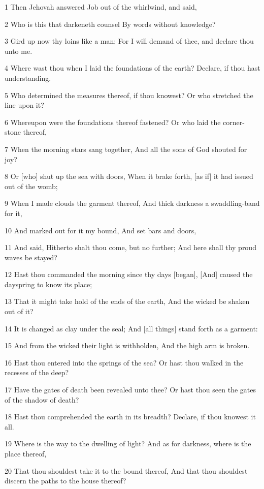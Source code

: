 \par 1 Then Jehovah answered Job out of the whirlwind, and said,
\par 2 Who is this that darkeneth counsel By words without knowledge?
\par 3 Gird up now thy loins like a man; For I will demand of thee, and declare thou unto me.
\par 4 Where wast thou when I laid the foundations of the earth? Declare, if thou hast understanding.
\par 5 Who determined the measures thereof, if thou knowest? Or who stretched the line upon it?
\par 6 Whereupon were the foundations thereof fastened? Or who laid the corner-stone thereof,
\par 7 When the morning stars sang together, And all the sons of God shouted for joy?
\par 8 Or [who] shut up the sea with doors, When it brake forth, [as if] it had issued out of the womb;
\par 9 When I made clouds the garment thereof, And thick darkness a swaddling-band for it,
\par 10 And marked out for it my bound, And set bars and doors,
\par 11 And said, Hitherto shalt thou come, but no further; And here shall thy proud waves be stayed?
\par 12 Hast thou commanded the morning since thy days [began], [And] caused the dayspring to know its place;
\par 13 That it might take hold of the ends of the earth, And the wicked be shaken out of it?
\par 14 It is changed as clay under the seal; And [all things] stand forth as a garment:
\par 15 And from the wicked their light is withholden, And the high arm is broken.
\par 16 Hast thou entered into the springs of the sea? Or hast thou walked in the recesses of the deep?
\par 17 Have the gates of death been revealed unto thee? Or hast thou seen the gates of the shadow of death?
\par 18 Hast thou comprehended the earth in its breadth? Declare, if thou knowest it all.
\par 19 Where is the way to the dwelling of light? And as for darkness, where is the place thereof,
\par 20 That thou shouldest take it to the bound thereof, And that thou shouldest discern the paths to the house thereof?
